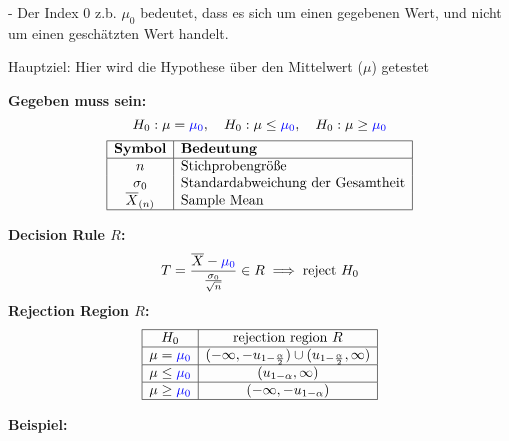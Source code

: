 - Der Index 0 z.b. $\mu_0$ bedeutet, dass es sich um einen gegebenen Wert, und nicht um einen geschätzten Wert handelt.

\begin{center}

Hauptziel: Hier wird die Hypothese über den
Mittelwert ($\mu$) getestet
\end{center}
\begin{center}
\end{center}


\large{\textbf{Gegeben muss sein:}}
\[
H_0: \mu = \textcolor{blue}{\mu_0}, \quad H_0: \mu \leq \textcolor{blue}{\mu_0}, \quad H_0: \mu \geq \textcolor{blue}{\mu_0}
\]
\[
\begin{array}{|c|l|}
\hline
\textbf{Symbol} & \textbf{Bedeutung} \\
\hline
n & \text{Stichprobengröße} \\
\sigma_0 & \text{Standardabweichung der Gesamtheit} \\
\overline{X}_{(n)} & \text{Sample Mean} \\
\hline
\end{array}
\]

\normalsize
\begin{comment}
\large{\textbf{Teststatistik:}}
\[
T = \frac{\overline{X}_{(n)} - \textcolor{blue}{\mu}}{\frac{\sigma_0}{\sqrt{n}}} \sim N(0,1)
\]
\end{comment}
\large{\textbf{Decision Rule  \(R\):}}
\[
T = \frac{\overline{X} - \textcolor{blue}{\mu_0}}{\frac{\sigma_0}{\sqrt{n}}} \in R \implies \text{reject } H_0
\]
\large{\textbf{Rejection Region \(R\):}}
\[
\begin{array}{|c|c|}
\hline
H_0 & \text{rejection region } R \\ \hline
\mu = \textcolor{blue}{\mu_0} & (-\infty, -u_{1-\frac{\alpha}{2}}) \cup (u_{1-\frac{\alpha}{2}}, \infty) \\ \hline
\mu \leq \textcolor{blue}{\mu_0} & (u_{1-\alpha}, \infty) \\ \hline
\mu \geq \textcolor{blue}{\mu_0} & (-\infty, -u_{1-\alpha}) \\ \hline
\end{array}
\]
\centering{}

\large{\textbf{Beispiel:}}

